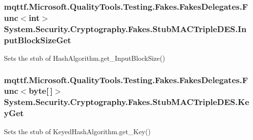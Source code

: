 \hypertarget{class_system_1_1_security_1_1_cryptography_1_1_fakes_1_1_stub_m_a_c_triple_d_e_s_a598b2e9e512ab245534b715f31caa862}{
\subsubsection[{Input\-Block\-Size\-Get}]{\setlength{\rightskip}{0pt plus 5cm}mqttf.\-Microsoft.\-Quality\-Tools.\-Testing.\-Fakes.\-Fakes\-Delegates.\-Func$<$int$>$ System.\-Security.\-Cryptography.\-Fakes.\-Stub\-M\-A\-C\-Triple\-D\-E\-S.\-Input\-Block\-Size\-Get}}\label{class_system_1_1_security_1_1_cryptography_1_1_fakes_1_1_stub_m_a_c_triple_d_e_s_a598b2e9e512ab245534b715f31caa862}


Sets the stub of Hash\-Algorithm.\-get\-\_\-\-Input\-Block\-Size()

\hypertarget{class_system_1_1_security_1_1_cryptography_1_1_fakes_1_1_stub_m_a_c_triple_d_e_s_a715b2f05b9dcc83c4c9fc6bd22e32001}{
\subsubsection[{Key\-Get}]{\setlength{\rightskip}{0pt plus 5cm}mqttf.\-Microsoft.\-Quality\-Tools.\-Testing.\-Fakes.\-Fakes\-Delegates.\-Func$<$byte\mbox{[}$\,$\mbox{]}$>$ System.\-Security.\-Cryptography.\-Fakes.\-Stub\-M\-A\-C\-Triple\-D\-E\-S.\-Key\-Get}}\label{class_system_1_1_security_1_1_cryptography_1_1_fakes_1_1_stub_m_a_c_triple_d_e_s_a715b2f05b9dcc83c4c9fc6bd22e32001}


Sets the stub of Keyed\-Hash\-Algorithm.\-get\-\_\-\-Key()

